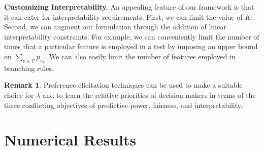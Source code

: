 \documentclass[letterpaper]{article} %
\theoremstyle{definition}
\newtheorem{remark}{Remark}[section]
\newcommand{\1}{\ensuremath{{\rm e}}} %
\begin{document}
\noindent\textbf{Customizing Interpretability.} An appealing feature of our framework is that it can cater for interpretability requirements. First, we can limit the value of $K$. Second, we can augment our formulation through the addition of linear interpretability constraints. For example, we can conveniently limit the number of times that a particular feature is employed in a test by imposing an upper bound on $\sum_{\nu \in \mathcal V} p_{vj}$. We can also easily limit the number of features employed in branching rules.


\begin{remark}
Preference elicitation techniques can be used to make a suitable choice for $\lambda$ and to learn the relative priorities of decision-makers in terms of the three conflicting objectives of predictive power, fairness, and interpretability.
\end{remark}


\section{Numerical Results}
\end{document}
